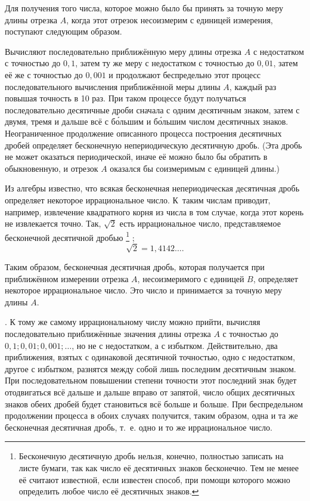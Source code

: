 \documentclass[oneside]{book}
\begin{document}
Для получения того числа, которое можно было бы принять за точную меру длины отрезка $A$, когда этот отрезок несоизмерим с единицей измерения, поступают следующим образом.

Вычисляют последовательно приближённую меру длины отрезка $A$ с недостатком с точностью до $0{,}1$, затем ту же меру с недостатком с точностью до $0{,}01$, затем её же с точностью до $0{,}001$ и продолжают беспредельно этот процесс последовательного вычисления приближённой меры длины $A$, каждый раз повышая точность в 10 раз.
При таком процессе будут получаться последовательно десятичные дроби сначала с одним десятичным знаком, затем с двумя, тремя и дальше всё с б\'{о}льшим и б\'{о}льшим числом десятичных знаков.
Неограниченное продолжение описанного процесса построения десятичных дробей определяет бесконечную непериодическую десятичную дробь.
(Эта дробь не может оказаться периодической, иначе её можно было бы обратить в обыкновенную, и отрезок $A$ оказался бы соизмеримым с единицей длины.)

Из алгебры известно, что всякая бесконечная непериодическая десятичная дробь определяет некоторое иррациональное число.
К~таким числам приводит, например, извлечение квадратного корня из числа в том случае, когда этот корень не извлекается точно.
Так, $\sqrt{2}$ есть иррациональное число, представляемое бесконечной десятичной дробью%
\footnote{Бесконечную десятичную дробь нельзя, конечно, полностью записать на листе бумаги, так как число её десятичных знаков бесконечно.
Тем не менее её считают известной, если известен способ, при помощи которого можно определить любое число её десятичных знаков.}%
;
\[\sqrt{2}  = 1{,}4142\dots .\]

Таким образом, бесконечная десятичная дробь, которая получается при приближённом измерении отрезка $A$, несоизмеримого с единицей $B$, определяет некоторое иррациональное число.
Это число и принимается за точную меру длины $A$.

.
К тому же самому иррациональному числу можно прийти, вычисляя последовательно приближённые значения длины отрезка $A$ с точностью до $0{,}1; 0{,}01; 0{,}001;\dots$, но не с недостатком, а с избытком.
Действительно, два приближения, взятых с одинаковой десятичной точностью, одно с недостатком, другое с избытком, разнятся между собой лишь последним десятичным знаком.
При последовательном повышении степени точности этот последний знак будет отодвигаться всё дальше и дальше вправо от запятой, число общих десятичных знаков обеих дробей будет становиться всё больше и больше.
При беспредельном продолжении процесса в обоих случаях получится, таким образом, одна и та же бесконечная десятичная дробь, т.~е.
одно и то же иррациональное число.
\end{document}

